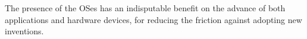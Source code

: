 The presence of the OSes has an indisputable benefit on the advance of both applications and hardware devices, for reducing the friction against adopting new inventions.



